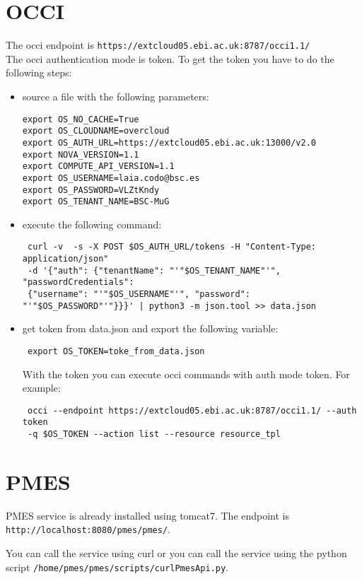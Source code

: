 \documentclass[a4paper,10pt]{article}
\begin{document}
\section{OCCI}
The occi endpoint is \texttt{https://extcloud05.ebi.ac.uk:8787/occi1.1/} \\
The occi authentication mode is token. To get the token you have to do the following steps:
\begin{itemize}
 \item source a file with the following parameters:
\begin{verbatim}
export OS_NO_CACHE=True
export OS_CLOUDNAME=overcloud
export OS_AUTH_URL=https://extcloud05.ebi.ac.uk:13000/v2.0
export NOVA_VERSION=1.1
export COMPUTE_API_VERSION=1.1
export OS_USERNAME=laia.codo@bsc.es
export OS_PASSWORD=VLZtKndy
export OS_TENANT_NAME=BSC-MuG
\end{verbatim}
\item execute the following command:
\begin{verbatim}
 curl -v  -s -X POST $OS_AUTH_URL/tokens -H "Content-Type: application/json" 
 -d '{"auth": {"tenantName": "'"$OS_TENANT_NAME"'", "passwordCredentials": 
 {"username": "'"$OS_USERNAME"'", "password": 
"'"$OS_PASSWORD"'"}}}' | python3 -m json.tool >> data.json
\end{verbatim}
\item get token from data.json and export the following variable:
\begin{verbatim}
 export OS_TOKEN=toke_from_data.json
\end{verbatim}

With the token you can execute occi commands with auth mode token. For example:
\begin{verbatim}
 occi --endpoint https://extcloud05.ebi.ac.uk:8787/occi1.1/ --auth token 
 -q $OS_TOKEN --action list --resource resource_tpl
\end{verbatim}

\end{itemize}

\section{PMES}
PMES service is already installed using tomcat7. The endpoint is \texttt{http://localhost:8080/pmes/pmes/}.

You can call the service using curl or you can call the service using the python script \texttt{/home/pmes/pmes/scripts/curlPmesApi.py}.
\end{document}
